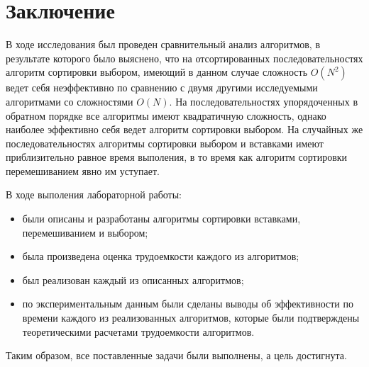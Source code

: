 \chapter*{Заключение}

В ходе исследования был проведен сравнительный анализ алгоритмов, в результате
которого было выяснено, что на отсортированных последовательностях алгоритм
сортировки выбором, имеющий в данном случае сложность $O(N^2)$ ведет себя
неэффективно по сравнению с двумя другими исследуемыми алгоритмами со
сложностями $O(N)$. На последовательностях упорядоченных в обратном порядке все
алгоритмы имеют квадратичную сложность, однако наиболее эффективно себя ведет
алгоритм сортировки выбором. На случайных же последовательностях алгоритмы
сортировки выбором и вставками имеют приблизительно равное время выполения, в
то время как алгоритм сортировки перемешиванием явно им уступает.

В ходе выполения лабораторной работы:

\begin{itemize}[left=\parindent]
    \item были описаны и разработаны алгоритмы сортировки вставками,
        перемешиванием и выбором;
    \item была произведена оценка трудоемкости каждого из алгоритмов;
    \item был реализован каждый из описанных алгоритмов;
    \item по экспериментальным данным были сделаны выводы об эффективности по
        времени каждого из реализованных алгоритмов, которые были подтверждены
        теоретическими расчетами трудоемкости алгоритмов.
\end{itemize}

Таким образом, все поставленные задачи были выполнены, а цель достигнута.
